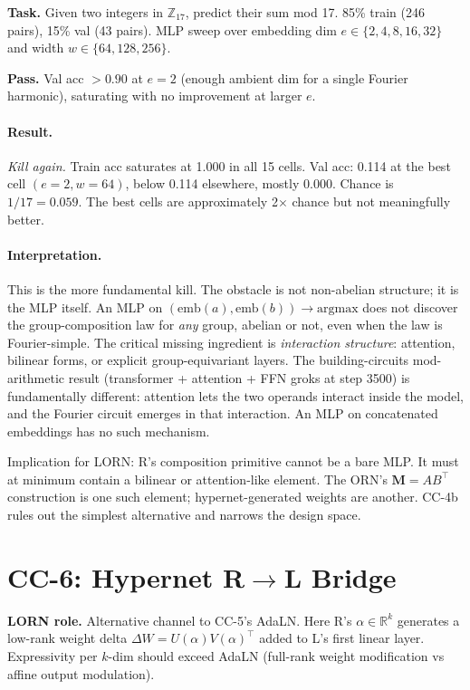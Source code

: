 \documentclass[10pt, twocolumn, a4paper]{article}
\newcommand{\R}{\mathbb{R}}
\newcommand{\M}{\mathbf{M}}
\begin{document}
\textbf{Task.} Given two integers in $\mathbb{Z}_{17}$, predict their sum mod 17. 85\% train (246 pairs), 15\% val (43 pairs). MLP sweep over embedding dim $e \in \{2, 4, 8, 16, 32\}$ and width $w \in \{64, 128, 256\}$.

\textbf{Pass.} Val acc $> 0.90$ at $e = 2$ (enough ambient dim for a single Fourier harmonic), saturating with no improvement at larger $e$.

\paragraph{Result.} \emph{Kill again.} Train acc saturates at 1.000 in all 15 cells. Val acc: 0.114 at the best cell $(e=2, w=64)$, below 0.114 elsewhere, mostly 0.000. Chance is $1/17 = 0.059$. The best cells are approximately 2$\times$ chance but not meaningfully better.

\paragraph{Interpretation.} This is the more fundamental kill. The obstacle is not non-abelian structure; it is the MLP itself. An MLP on $(\mathrm{emb}(a), \mathrm{emb}(b)) \to \mathrm{argmax}$ does not discover the group-composition law for \emph{any} group, abelian or not, even when the law is Fourier-simple. The critical missing ingredient is \emph{interaction structure}: attention, bilinear forms, or explicit group-equivariant layers. The building-circuits mod-arithmetic result (transformer + attention + FFN groks at step 3500) is fundamentally different: attention lets the two operands interact inside the model, and the Fourier circuit emerges in that interaction. An MLP on concatenated embeddings has no such mechanism.

Implication for LORN: R's composition primitive cannot be a bare MLP. It must at minimum contain a bilinear or attention-like element. The ORN's $\M = AB^\top$ construction is one such element; hypernet-generated weights are another. CC-4b rules out the simplest alternative and narrows the design space.

\section{CC-6: Hypernet R$\to$L Bridge}

\textbf{LORN role.} Alternative channel to CC-5's AdaLN. Here R's $\alpha \in \R^k$ generates a low-rank weight delta $\Delta W = U(\alpha) V(\alpha)^\top$ added to L's first linear layer. Expressivity per $k$-dim should exceed AdaLN (full-rank weight modification vs affine output modulation).
\end{document}

